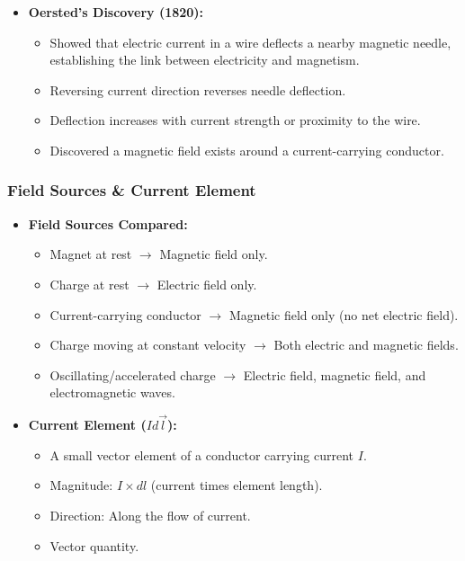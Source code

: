 \begin{frame}[t]
\begin{itemize}
      \item<+-> \textbf{Oersted's Discovery (1820):}
        \begin{itemize}
              \item Showed that electric current in a wire deflects a nearby magnetic needle, establishing the link between electricity and magnetism.
              \item Reversing current direction reverses needle deflection.
              \item Deflection increases with current strength or proximity to the wire.
              \item Discovered a magnetic field exists around a current-carrying conductor.
        \end{itemize}
    \end{itemize}
\end{frame}

\transfade[duration=0.5]

\begin{frame}[t]
    \frametitle{\textcolor{deepnavy}{\textbf{Field Sources & Current Element}}}
    \renewcommand{\familydefault}{\rmdefault}
    \small

    \begin{itemize}
      \item<+-> \textbf{Field Sources Compared:}
        \begin{itemize}
              \item Magnet at rest $\rightarrow$ Magnetic field only.
              \item Charge at rest $\rightarrow$ Electric field only.
              \item Current-carrying conductor $\rightarrow$ Magnetic field only (no net electric field).
              \item Charge moving at constant velocity $\rightarrow$ Both electric and magnetic fields.
              \item Oscillating/accelerated charge $\rightarrow$ Electric field, magnetic field, and electromagnetic waves.
        \end{itemize}

    \vspace{1em}

      \item<+-> \textbf{Current Element ($I d\vec{l}$):}
        \begin{itemize}
              \item A small vector element of a conductor carrying current $I$.
              \item Magnitude: $I \times dl$ (current times element length).
              \item Direction: Along the flow of current.
              \item Vector quantity.
        \end{itemize}
    \end{itemize}
\end{frame}

